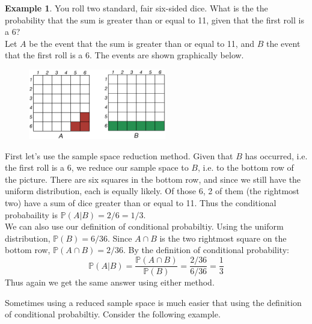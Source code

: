 \documentclass[12pt]{article}
\theoremstyle{definition}
\newtheorem*{example}{Example}
\theoremstyle{remark}
\def\P{{\mathbb P}}
\begin{document}
\begin{example}
You roll two standard, fair six-sided dice. What is the the probability that the sum is greater than or equal to 11, given that the first roll is a 6?\\

Let $A$ be the event that the sum is greater than or equal to 11, and $B$ the event that the first roll is a 6. The events are shown graphically below.
\begin{figure}[H]
\centering
\includegraphics[width=6cm]{2dice1.eps}
\end{figure}
First let's use the sample space reduction method. Given that $B$ has occurred, i.e. the first roll is a 6, we reduce our sample space to $B$, i.e. to the bottom row of the picture. There are six squares in the bottom row, and since we still have the uniform distribution, each is equally likely. Of those 6, 2 of them (the rightmost two) have a sum of dice greater than or equal to 11. Thus the conditional probabaility is $\P(A|B) = 2/6 = 1/3$.\\

We can also use our definition of conditional probabiltiy. Using the uniform distribution, $\P(B) = 6/36$. Since $A \cap B$ is the two rightmost square on the bottom row, $\P(A \cap B) = 2/36$. By the definition of conditional probability:
\[
\P(A|B) = \frac{ \P(A \cap B)}{\P(B)} = \frac{2/36}{6/36} = \frac{1}{3}
\]
Thus again we get the same answer using either method.
\end{example}

Sometimes using a reduced sample space is much easier that using the definition of conditional probabiltiy. Consider the following example.
\end{document}
